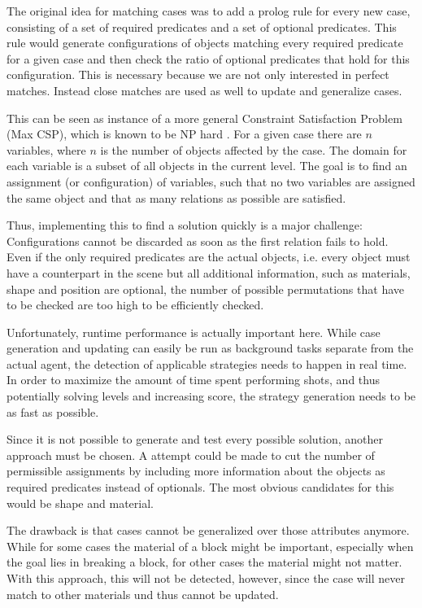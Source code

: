 The original idea for matching cases was to add a prolog rule for every new case, consisting of a set of required predicates and a set of optional predicates.
This rule would generate configurations of objects matching every required predicate for a given case and then check the ratio of optional predicates that hold for this configuration.
This is necessary because we are not only interested in perfect matches. Instead close matches are used as well to update and generalize cases.


This can be seen as instance of a more general Constraint Satisfaction Problem (Max CSP), which is known to be NP hard \cite{Samorodnitsky2000APC}. For a given case there are $n$ variables, where $n$ is the number of objects affected by the case. The domain for each variable is a subset of all objects in the current level. The goal is to find an assignment (or configuration) of variables, such that no two variables are assigned the same object and that as many relations as possible are satisfied.

Thus, implementing this to find a solution quickly is a major challenge:
Configurations cannot be discarded as soon as the first relation fails to hold.
Even if the only required predicates are the actual objects, i.e. every object must have a counterpart in the scene but all additional information, such as materials, shape and position are optional, the number of possible permutations that have to be checked are too high to be efficiently checked.

Unfortunately, runtime performance is actually important here. While case generation and updating can easily be run as background tasks separate from the actual agent, the detection of applicable strategies needs to happen in real time.
In order to maximize the amount of time spent performing shots, and thus potentially solving levels and increasing score, the strategy generation needs to be as fast as possible.

Since it is not possible to generate and test every possible solution, another approach must be chosen. A attempt could be made to cut the number of permissible assignments by including more information about the objects as required predicates instead of optionals.
The most obvious candidates for this would be shape and material.

The drawback is that cases cannot be generalized over those attributes anymore. While for some cases the material of a block might be important, especially when the goal lies in breaking a block, for other cases the material might not matter.
With this approach, this will not be detected, however, since the case will never match to other materials und thus cannot be updated.

